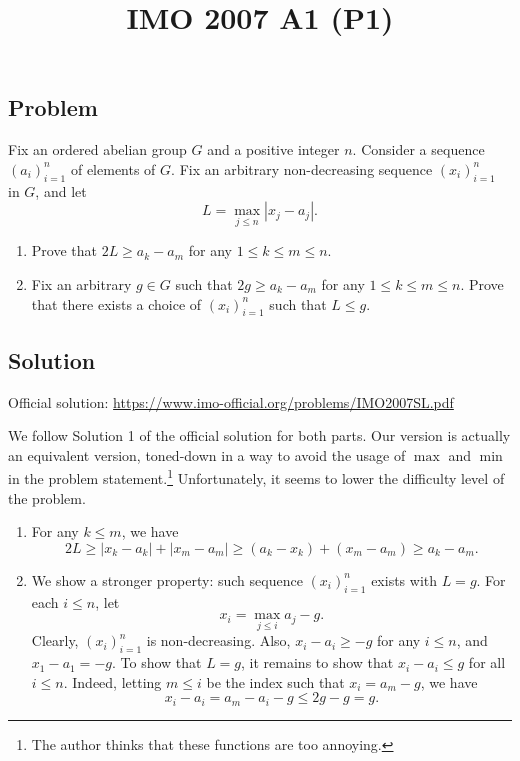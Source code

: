 \documentclass{article}
\title{IMO 2007 A1 (P1)}
\author{}
\date{}
\begin{document}
\maketitle



\subsection*{Problem}

Fix an ordered abelian group $G$ and a positive integer $n$.
Consider a sequence $(a_i)_{i = 1}^n$ of elements of $G$.
Fix an arbitrary non-decreasing sequence $(x_i)_{i = 1}^n$ in $G$, and let
\[ L = \max_{j \leq n} |x_j - a_j|. \]

\begin{enumerate}
    \item   Prove that $2L \geq a_k - a_m$ for any $1 \leq k \leq m \leq n$.
    \item   Fix an arbitrary $g \in G$ such that $2g \geq a_k - a_m$ for any $1 \leq k \leq m \leq n$.
            Prove that there exists a choice of $(x_i)_{i = 1}^n$ such that $L \leq g$.
\end{enumerate}



\subsection*{Solution}

Official solution: \url{https://www.imo-official.org/problems/IMO2007SL.pdf}

We follow Solution 1 of the official solution for both parts.
Our version is actually an equivalent version, toned-down in a way to avoid the usage of $\max$ and $\min$ in the problem statement.\footnote{The author thinks that these functions are too annoying.}
Unfortunately, it seems to lower the difficulty level of the problem.


\begin{enumerate}

\item
For any $k \leq m$, we have
\[ 2L \geq |x_k - a_k| + |x_m - a_m| \geq (a_k - x_k) + (x_m - a_m) \geq a_k - a_m. \]



\item
We show a stronger property: such sequence $(x_i)_{i = 1}^n$ exists with $L = g$.
For each $i \leq n$, let
\[ x_i = \max_{j \leq i} a_j - g. \]
Clearly, $(x_i)_{i = 1}^n$ is non-decreasing.
Also, $x_i - a_i \geq -g$ for any $i \leq n$, and $x_1 - a_1 = -g$.
To show that $L = g$, it remains to show that $x_i - a_i \leq g$ for all $i \leq n$.
Indeed, letting $m \leq i$ be the index such that $x_i = a_m - g$, we have
\[ x_i - a_i = a_m - a_i - g \leq 2g - g = g. \]

\end{enumerate}
\end{document}
